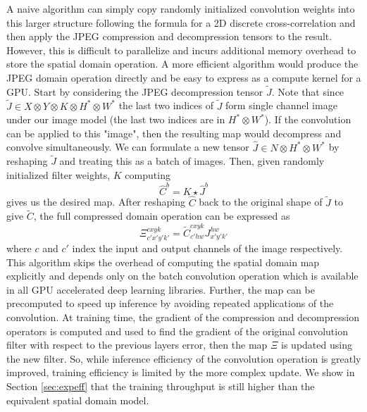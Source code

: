 \documentclass[10pt,twocolumn,letterpaper]{article}
\begin{document}
A naive algorithm can simply copy randomly initialized convolution weights into this larger structure following the formula for a 2D discrete cross-correlation and then apply the JPEG compression and decompression tensors to the result. However, this is difficult to parallelize and incurs additional memory overhead to store the spatial domain operation. A more efficient algorithm would produce the JPEG domain operation directly and be easy to express as a compute kernel for a GPU. Start by considering the JPEG decompression tensor $\widetilde{J}$. Note that since $\widetilde{J} \in X \otimes Y \otimes K \otimes H^* \otimes W^*$ the last two indices of $\widetilde{J}$ form single channel image under our image model (\eg the last two indices are in $H^* \otimes W^*$). If the convolution can be applied to this "image", then the resulting map would decompress and convolve simultaneously. We can formulate a new tensor $\widehat{J} \in N \otimes H^* \otimes W^*$
by reshaping $\widetilde{J}$ and treating this as a batch of images. Then, given randomly initialized filter weights, $K$ computing 
\begin{equation}
\widehat{C}^b = K \star \widehat{J}^b 
\end{equation}
gives us the desired map. After reshaping $\widehat{C}$ back to the original shape of $\widetilde{J}$ to give $\widetilde{C}$, the full compressed domain operation can be expressed as 
\begin{equation}
\Xi^{cxyk}_{c'x'y'k'} = \widetilde{C}^{cxyk}_{c'hw}J^{hw}_{x'y'k'}
\end{equation}
where $c$ and $c'$ index the input and output channels of the image respectively. This algorithm skips the overhead of computing the spatial domain map explicitly and depends only on the batch convolution operation which is available in all GPU accelerated deep learning libraries. Further, the map can be precomputed to speed up inference by avoiding repeated applications of the convolution. At training time, the gradient of the compression and decompression operators is computed and used to find the gradient of the original convolution filter with respect to the previous layers error, then the map $\Xi$ is updated using the new filter. So, while inference efficiency of the convolution operation is greatly improved, training efficiency is limited by the more complex update. We show in Section \ref{sec:expeff} that the training throughput is still higher than the equivalent spatial domain model.
\end{document}
